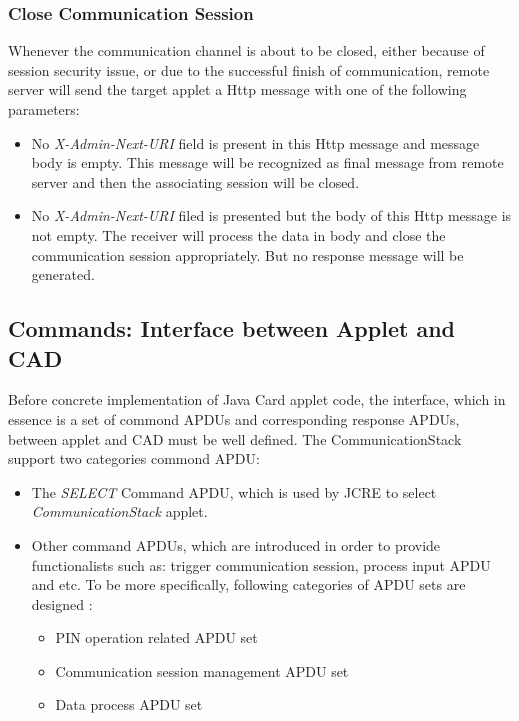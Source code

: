 \subsubsection{Close Communication Session}
Whenever the communication channel is about to be closed, either because of session security issue, or due to the successful finish of communication, remote server will send the target applet a Http message with one of the following parameters:
 \begin{itemize}
  \item No \emph{X-Admin-Next-URI} field is present in this Http message and message body is empty. This message will be recognized as final message from remote server and then the associating session will be closed.
  \item No \emph{X-Admin-Next-URI} filed is presented but the body of this Http message is not empty. The receiver will process the data in body and close the communication session appropriately. But no response message will be generated.
\end{itemize}

\subsection {Commands: Interface between Applet and CAD} \label{secAPDU}
Before concrete implementation of Java Card applet code, the interface, which in essence is a set of commond APDUs and corresponding response APDUs, between applet and CAD must be well defined.  The CommunicationStack support two categories commond APDU:
 \begin{itemize}
  \item The \emph{SELECT} Command APDU, which is used by JCRE to select \emph{CommunicationStack} applet.
  \item Other command APDUs, which are introduced in order to provide functionalists such as: trigger communication session, process input APDU and etc. To be more specifically, following categories of APDU sets are designed :
\begin{itemize}
  \item PIN operation related APDU set
  \item Communication session management APDU set
  \item Data process APDU set
\end{itemize}
\end{itemize}

